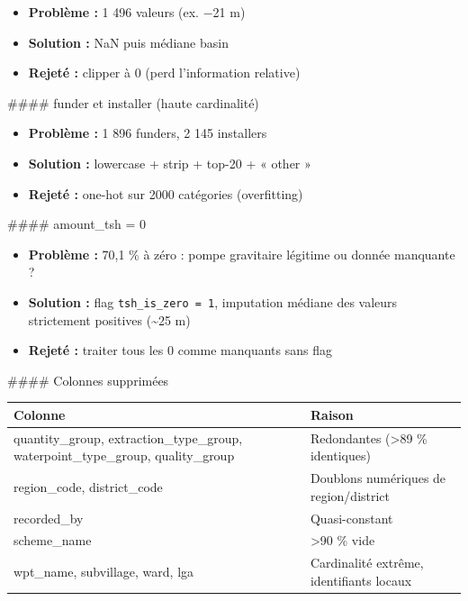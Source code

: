 \documentclass[11pt,a4paper]{report}
\begin{document}
\begin{itemize}

\item \textbf{Problème :} 1 496 valeurs (ex. −21 m)

\item \textbf{Solution :} NaN puis médiane basin

\item \textbf{Rejeté :} clipper à 0 (perd l'information relative)

\end{itemize}

\#\#\#\# funder et installer (haute cardinalité)

\begin{itemize}

\item \textbf{Problème :} 1 896 funders, 2 145 installers

\item \textbf{Solution :} lowercase + strip + top-20 + « other »

\item \textbf{Rejeté :} one-hot sur 2000 catégories (overfitting)

\end{itemize}

\#\#\#\# amount\_tsh = 0

\begin{itemize}

\item \textbf{Problème :} 70,1 \% à zéro : pompe gravitaire légitime ou donnée manquante ?

\item \textbf{Solution :} flag \texttt{tsh\_is\_zero = 1}, imputation médiane des valeurs strictement positives (\textasciitilde{}25 m)

\item \textbf{Rejeté :} traiter tous les 0 comme manquants sans flag

\end{itemize}

\#\#\#\# Colonnes supprimées

{\small
\begin{longtable}{@{}>{\raggedright\arraybackslash}p{}>{\raggedright\arraybackslash}p{}@{}}
\toprule
\rowcolor{EHTPTableHead}Colonne & Raison \\
\midrule
quantity\_group, extraction\_type\_group, waterpoint\_type\_group, quality\_group & Redondantes (>89 \% identiques) \\
region\_code, district\_code & Doublons numériques de region/district \\
recorded\_by & Quasi-constant \\
scheme\_name & >90 \% vide \\
wpt\_name, subvillage, ward, lga & Cardinalité extrême, identifiants locaux \\
\bottomrule
\end{longtable}
}
\end{document}
